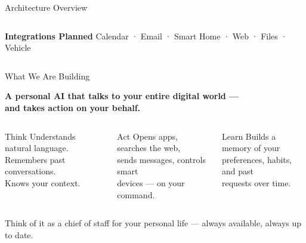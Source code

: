 \documentclass[aspectratio=169,11pt]{beamer}
\begin{document}
\begin{frame}{Architecture Overview}
\begin{columns}[T]
    \vspace{0.8em}
    \textbf{\color{accentcol}Integrations Planned}
    {\small Calendar · Email · Smart Home · Web · Files · Vehicle}

  \end{columns}
\end{frame}


\begin{frame}{What We Are Building}
  \vspace{0.5em}
  \begin{center}
    {\large\bfseries\color{accentcol}
      A personal AI that talks to your entire digital world —\\
      and takes action on your behalf.}
  \end{center}
  \vspace{1em}
  \begin{columns}[T]
    \begin{block}{Think}
      \small Understands natural language.\\
      Remembers past conversations.\\
      Knows your context.
    \end{block}
    \begin{block}{Act}
      \small Opens apps, searches the web,\\
      sends messages, controls smart\\
      devices — on your command.
    \end{block}
    \begin{block}{Learn}
      \small Builds a memory of your\\
      preferences, habits, and past\\
      requests over time.
    \end{block}
  \end{columns}
  \vspace{1em}
  \begin{center}
    {\small\color{subtext}
      Think of it as a chief of staff for your personal life —
      always available, always up to date.}
  \end{center}
\end{frame}
\end{document}
